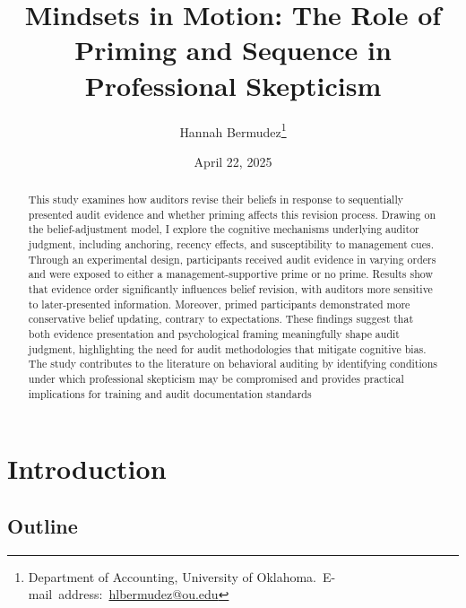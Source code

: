 \documentclass[12pt,english]{article}
\begin{document}
\begin{singlespace}
\title{Mindsets in Motion: The Role of Priming and Sequence in Professional Skepticism}
\end{singlespace}

\author{Hannah Bermudez\thanks{Department of Accounting, University of Oklahoma.\
E-mail~address:~\href{mailto:student.name@ou.edu}{hlbermudez@ou.edu}}}

\date{April 22, 2025}

\maketitle

\begin{abstract}
\begin{singlespace}
This study examines how auditors revise their beliefs in response to sequentially presented audit evidence and whether priming affects this revision process. Drawing on the belief-adjustment model, I explore the cognitive mechanisms underlying auditor judgment, including anchoring, recency effects, and susceptibility to management cues. Through an experimental design, participants received audit evidence in varying orders and were exposed to either a management-supportive prime or no prime. Results show that evidence order significantly influences belief revision, with auditors more sensitive to later-presented information. Moreover, primed participants demonstrated more conservative belief updating, contrary to expectations. These findings suggest that both evidence presentation and psychological framing meaningfully shape audit judgment, highlighting the need for audit methodologies that mitigate cognitive bias. The study contributes to the literature on behavioral auditing by identifying conditions under which professional skepticism may be compromised and provides practical implications for training and audit documentation standards
\end{singlespace}

\end{abstract}
\vfill{}


\pagebreak{}


\section{Introduction}\label{sec:intro}
\subsection{Outline}
\end{document}

